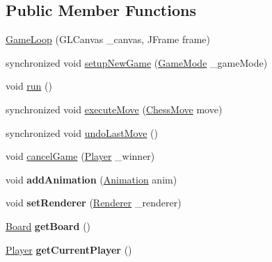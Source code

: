 \subsection*{Public Member Functions}
\begin{DoxyCompactItemize}
\item 
\hyperlink{classcontroller_1_1_game_loop_ad7c4e9e77101658404db3a37b21dfafb}{Game\-Loop} (G\-L\-Canvas \-\_\-canvas, J\-Frame frame)
\item 
synchronized void \hyperlink{classcontroller_1_1_game_loop_a416822fda05ffdbbe385b5157b120a98}{setup\-New\-Game} (\hyperlink{interfacemodel_1_1game__modes_1_1_game_mode}{Game\-Mode} \-\_\-game\-Mode)
\item 
void \hyperlink{classcontroller_1_1_game_loop_a50c1df21b6fcb5de95b90215cc6f0261}{run} ()
\item 
synchronized void \hyperlink{classcontroller_1_1_game_loop_a2f455d14b32197c0506025227b1cfa59}{execute\-Move} (\hyperlink{classmodel_1_1_chess_move}{Chess\-Move} move)
\item 
synchronized void \hyperlink{classcontroller_1_1_game_loop_a9747fb2e4d65a3918d1f589bf6e06e03}{undo\-Last\-Move} ()
\item 
void \hyperlink{classcontroller_1_1_game_loop_a3c58f6ba8b5ec3510ff521c7686e1c11}{cancel\-Game} (\hyperlink{classcontroller_1_1_player}{Player} \-\_\-winner)
\item 
\hypertarget{classcontroller_1_1_game_loop_a8fd38b2b4d1fc537055388bbc369f8e3}{void {\bfseries add\-Animation} (\hyperlink{classcontroller_1_1util_1_1_animation}{Animation} anim)}\label{classcontroller_1_1_game_loop_a8fd38b2b4d1fc537055388bbc369f8e3}

\item 
\hypertarget{classcontroller_1_1_game_loop_a23711cbf256215f376af6854e698c374}{void {\bfseries set\-Renderer} (\hyperlink{classview_1_1_renderer}{Renderer} \-\_\-renderer)}\label{classcontroller_1_1_game_loop_a23711cbf256215f376af6854e698c374}

\item 
\hypertarget{classcontroller_1_1_game_loop_a85488db6ce4c71d17af67eda4f04e3a9}{\hyperlink{classmodel_1_1board_1_1_board}{Board} {\bfseries get\-Board} ()}\label{classcontroller_1_1_game_loop_a85488db6ce4c71d17af67eda4f04e3a9}

\item 
\hypertarget{classcontroller_1_1_game_loop_aa574b3655f4c4c3aa3d04be065a11b2b}{\hyperlink{classcontroller_1_1_player}{Player} {\bfseries get\-Current\-Player} ()}\label{classcontroller_1_1_game_loop_aa574b3655f4c4c3aa3d04be065a11b2b}


\end{DoxyCompactItemize}
